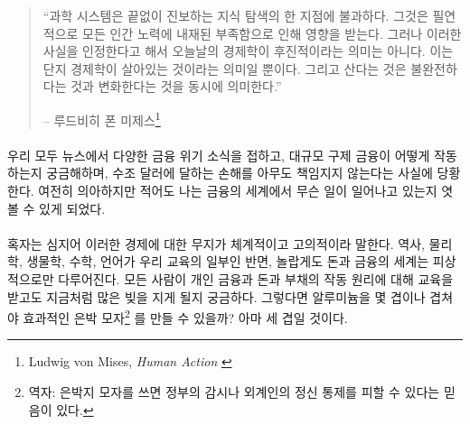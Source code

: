 \begin{quotation}\begin{samepage}
		\enquote{과학 시스템은 끝없이 진보하는 지식 탐색의 한 지점에 불과하다. 
			그것은 필연적으로 모든 인간 노력에 내재된 부족함으로 인해 영향을 받는다.
			그러나 이러한 사실을 인정한다고 해서 오늘날의 경제학이 후진적이라는 의미는 아니다.
			이는 단지 경제학이 살아있는 것이라는 의미일 뿐이다. 
			그리고 산다는 것은 불완전하다는 것과 변화한다는 것을 동시에 의미한다.}
		\begin{flushright} -- 루드비히 폰 미제스\footnote{Ludwig von Mises, \textit{Human Action}
				\cite{human-action}}
\end{flushright}\end{samepage}\end{quotation}


\paragraph{}
우리 모두 뉴스에서 다양한 금융 위기 소식을 접하고, 대규모 구제 금융이 어떻게 작동하는지 궁금해하며, 
수조 달러에 달하는 손해를 아무도 책임지지 않는다는 사실에 당황한다.
여전히 의아하지만 적어도 나는 금융의 세계에서 무슨 일이 일어나고 있는지 엿볼 수 있게 되었다.

\paragraph{}
혹자는 심지어 이러한 경제에 대한 무지가 체계적이고 고의적이라 말한다.
역사, 물리학, 생물학, 수학, 언어가 우리 교육의 일부인 반면, 
놀랍게도 돈과 금융의 세계는 피상적으로만 다루어진다. 
모든 사람이 개인 금융과 돈과 부채의 작동 원리에 대해 교육을 받고도 지금처럼 많은 빚을 지게 될지 궁금하다.
그렇다면 알루미늄을 몇 겹이나 겹쳐야 효과적인 은박 모자\footnote{역자: 은박지 모자를 쓰면 정부의 감시나 외계인의 정신 통제를 피할 수 있다는 믿음이 있다.}
를 만들 수 있을까? 아마 세 겹일 것이다.

